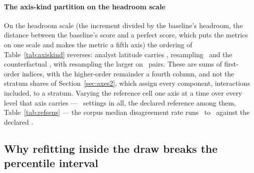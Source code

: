 \paragraph{The axis-kind partition on the headroom scale}
On the headroom scale (the increment divided by the baseline's headroom, the
distance between the baseline's score and a perfect score, which puts the
metrics on one scale and makes the metric a fifth axis) the ordering of
Table~\ref{tab:axiskind} reverses: analyst latitude carries
\shareLatitudeCrossPct, resampling \shareResamplingCrossPct\ and the
counterfactual \shareCounterfactualCrossPct, with resampling the larger on
\nPairsResamplingOverLatitudeCross\ pairs. These are sums of first-order
indices, with the higher-order remainder a fourth column, and not the stratum
shares of Section~\ref{sec:axes2}, which assign every component, interactions
included, to a stratum. Varying the reference cell one axis at a time over
every level that axis carries --- \nRefSensVariants\ settings in all, the
declared reference among them, Table~\ref{tab:refsens} --- the corpus median
disagreement rate runs \ to \ against the
declared .

\subsection{Why refitting inside the draw breaks the percentile interval}
\label{app:pctfail}


